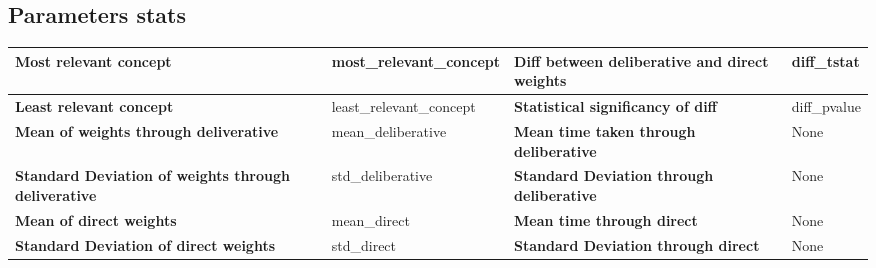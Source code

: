 \documentclass{article}
\begin{document}
    \subsection*{Parameters stats}
    \renewcommand{\arraystretch}{1.3}
    \begin{small}
        \begin{tabular}{|m{5.3cm}|m{3.15cm}|m{5.3cm}|m{3.15cm}|}
            \hline
            \textbf{Most relevant concept}                              & {{most_relevant_concept}}  & \textbf{Diff between deliberative and direct weights} & {{diff_tstat}} \\
            \hline
            \textbf{Least relevant concept}                             & {{least_relevant_concept}} & \textbf{Statistical significancy of diff}             & {{diff_pvalue}} \\
            \hline
            \textbf{Mean of weights through deliverative}               & {{mean_deliberative}}      & \textbf{Mean time taken through deliberative} & None \\
            \hline
            \textbf{Standard Deviation of weights through deliverative} & {{std_deliberative}} & \textbf{Standard Deviation through deliberative} & None \\
            \hline
            \textbf{Mean of direct weights}                             & {{mean_direct}}            & \textbf{Mean time through direct}                     & None \\
            \hline
            \textbf{Standard Deviation of direct weights}               & {{std_direct}}             & \textbf{Standard Deviation through direct} & None \\
            \hline
        \end{tabular}
    \end{small}

    \thispagestyle{empty}
\end{document}
